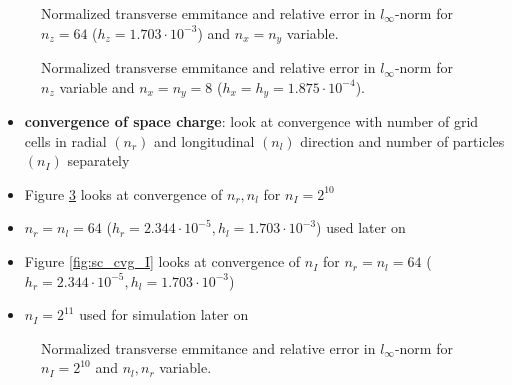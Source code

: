 \begin{center}
\begin{figure}[H]
   \begin{subfigure}{0.4\textwidth}
      
   \end{subfigure}
   \qquad \qquad \qquad
   \begin{subfigure}{0.4\textwidth}
      
   \end{subfigure}
   \caption{Normalized transverse emmitance and relative error in $l_\infty$-norm for $n_z=64$ ($h_z=1.703 \cdot 10^{-3}$) and $n_x=n_y$ variable.}
   \label{fig:map_cvg_xy}
\end{figure}
\end{center}

\begin{center}
\begin{figure}[H]
   \begin{subfigure}{0.4\textwidth}
      
   \end{subfigure}
   \qquad \qquad \qquad
   \begin{subfigure}{0.4\textwidth}
      
   \end{subfigure}
   \caption{Normalized transverse emmitance and relative error in $l_\infty$-norm for $n_z$ variable and $n_x=n_y=8$ ($h_x=h_y=1.875 \cdot 10^{-4}$).}
   \label{fig:map_cvg_z}
\end{figure}
\end{center}

\begin{itemize}
   \item \textbf{convergence of space charge}: look at convergence with number of grid cells in radial $(n_r)$ and longitudinal $(n_l)$ direction and number of particles $(n_I)$ separately

   \item Figure \ref{fig:sc_cvg_rl} looks at convergence of $n_r, n_l$ for $n_I=2^{10}$
   \item $n_r=n_l=64$ ($h_r=2.344 \cdot 10^{-5}, h_l=1.703 \cdot 10^{-3}$) used later on

   \item Figure \ref{fig:sc_cvg_I} looks at convergence of $n_I$ for $n_r=n_l=64$ ($h_r=2.344 \cdot 10^{-5}, h_l=1.703 \cdot 10^{-3}$)
   \item $n_I=2^{11}$ used for simulation later on
\end{itemize}

\begin{center}
\begin{figure}[H]
   \begin{subfigure}{0.4\textwidth}
      
   \end{subfigure}
   \qquad \qquad \qquad
   \begin{subfigure}{0.4\textwidth}
      
   \end{subfigure}
   \caption{Normalized transverse emmitance and relative error in $l_\infty$-norm for $n_I=2^{10}$ and $n_l, n_r$ variable.}
   \label{fig:sc_cvg_rl}
\end{figure}
\end{center}

